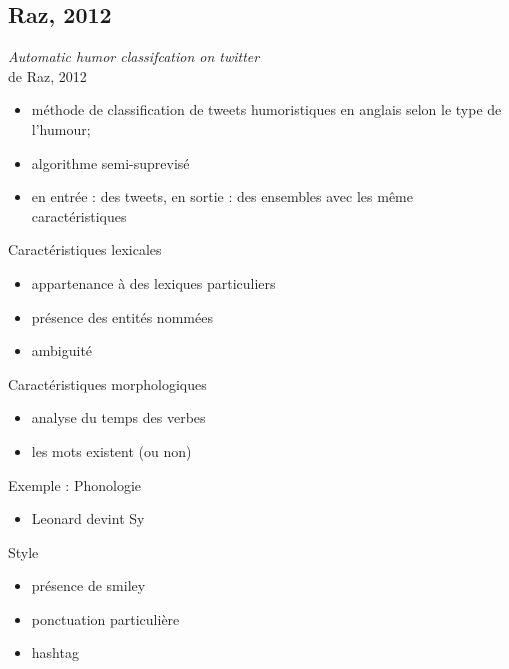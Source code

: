 \documentclass{beamer}
\begin{document}
\subsection{Raz, 2012}
\begin{frame}[allowframebreaks]{\textit{Automatic humor classifcation on twitter}\\ de Raz, 2012 \cite{Raz12}}

\begin{itemize}
 \item méthode de classification de tweets humoristiques en anglais selon le type de l’humour;
\item algorithme semi-suprevisé
\item en entrée : des tweets, en sortie : des ensembles avec les même caractéristiques
\end{itemize}

\begin{block}{Caractéristiques lexicales}
\begin{itemize}
\item appartenance à des lexiques particuliers
\item présence des entités nommées
\item ambiguité
\end{itemize}
\end{block}

\vspace*{1.1cm}
\begin{block}{Caractéristiques morphologiques}
\begin{itemize}
\item analyse du temps des verbes
\item les mots existent (ou non)
\end{itemize}
\end{block}

\vspace*{1.1cm}
\begin{exampleblock}{Exemple : Phonologie}
\begin{itemize}
\item Leonard devint Sy
\end{itemize}
\end{exampleblock}

\vspace*{1.1cm}
\begin{block}{Style}
\begin{itemize}
\item présence de smiley
\item ponctuation particulière
\item hashtag
\end{itemize}
\end{block}


\end{frame}
\end{document}
